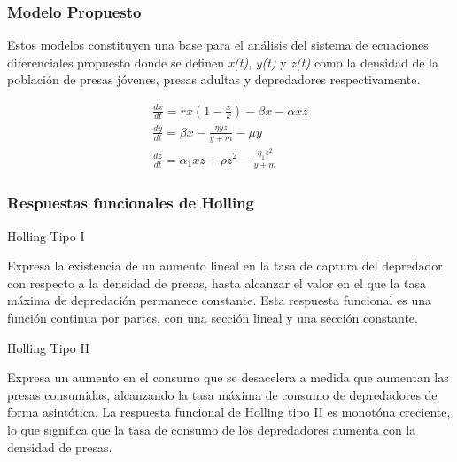 \documentclass{beamer}
\begin{document}
\begin{frame}
	\frametitle{Modelo Propuesto}
	\begin{minipage}{10cm}
	Estos modelos constituyen una base para el análisis 
	del sistema de ecuaciones diferenciales propuesto donde se definen \emph{x(t)}, \emph{y(t)} y \emph{z(t)} como la densidad de la poblaci\'on de presas j\'ovenes, presas adultas y depredadores respectivamente.
	
	\begin{equation} \label{twoPreyonePredatorEDO}
	\begin{gathered}
	\frac{d x}{d t}=r x\left(1-\frac{x}{k}\right)-\beta x-\alpha x z \\
	\frac{d y}{d t}=\beta x-\frac{\eta y z}{y+m}-\mu y \\
	\frac{d z}{d t}=\alpha_1 x z + \rho z^2-\frac{\eta_1 z^2}{y+m}
	\end{gathered}
	\end{equation}
		
	\end{minipage}
\end{frame}



\begin{frame}
	\frametitle{Respuestas funcionales de Holling}
	\begin{alertblock}{\begin{dinglist}{45}
				\item Holling Tipo I
		\end{dinglist}}
		\begin{minipage}{10.5cm}
			Expresa la existencia de un aumento lineal en la tasa de captura del depredador con respecto a la densidad de presas, hasta alcanzar el valor en 
			el que la tasa máxima de depredación permanece constante. Esta respuesta funcional es una función continua por partes, con una sección lineal y una sección constante.
		\end{minipage}
	\end{alertblock}
\begin{alertblock}{\begin{dinglist}{45}
			\item Holling Tipo II
	\end{dinglist}}
	\begin{minipage}{10.5cm}
		Expresa un aumento en el consumo que se desacelera a medida que aumentan las presas consumidas, alcanzando la tasa máxima de consumo de 
		depredadores de forma asintótica. La respuesta funcional de Holling tipo II es monotóna creciente, lo que significa que la tasa de consumo 
		de los depredadores aumenta con la densidad de presas.
	\end{minipage}
\end{alertblock}
\end{frame}
\end{document}
